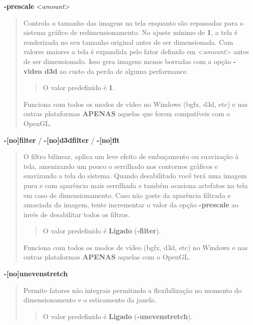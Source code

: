 \documentclass[letterpaper,10pt,brazil]{sphinxmanual}
\begin{document}
\label{commandline/commandline-all:mame-commandline-prescale}
\textbf{-prescale} \textless{}\emph{amount}\textgreater{}
\begin{quote}

Controla o tamanho das imagens na tela enquanto são repassadas para
o sistema gráfico de redimensionamento. No ajuste mínimo de \textbf{1}, a
tela é renderizada no seu tamanho original antes de ser
dimensionada. Com valores maiores a tela é expandida pelo fator
definido em \textless{}\emph{amount}\textgreater{} antes de ser dimensionado. Isso gera imagens
menos borradas com a opção \textbf{-video d3d} ao custo da perda de
alguma performance.
\begin{quote}

O valor predefinido é \textbf{1}.
\end{quote}

Funciona com todos os modos de vídeo no Windows (bgfx, d3d, etc) e
nas outras plataformas \textbf{APENAS} aquelas que forem compatíveis com
o OpenGL.
\end{quote}
\label{commandline/commandline-all:mame-commandline-filter}
\textbf{-{[}no{]}filter} / \textbf{-{[}no{]}d3dfilter} / \textbf{-{[}no{]}flt}
\begin{quote}

O filtro bilinear, aplica um leve efeito de embaçamento ou
suavização à tela, amenizando um pouco o serrilhado nos contornos
gráficos e suavizando a tela do sistema.
Quando desabilitado você terá uma imagem pura e com aparência mais
serrilhada e também ocasiona artefatos na tela em caso de
dimensionamento. Caso não goste da aparência filtrada e amaciada da
imagem, tente incrementar o valor da opção \textbf{-prescale} ao invés de
desabilitar todos os filtros.
\begin{quote}

O valor predefinido é \textbf{Ligado} (\textbf{-filter}).
\end{quote}

Funciona com todos os modos de vídeo (bgfx, d3d, etc) no Windows e
nas outras plataformas \textbf{APENAS} aquelas com o OpenGL.
\end{quote}
\label{commandline/commandline-all:mame-commandline-unevenstretch}
\textbf{-{[}no{]}unevenstretch}
\begin{quote}

Permite fatores não integrais permitindo a flexibilização no momento
do dimensionamento e o esticamento da janela.
\begin{quote}

O valor predefinido é \textbf{Ligado} (\textbf{-unevenstretch}).
\end{quote}
\end{quote}
\end{document}
